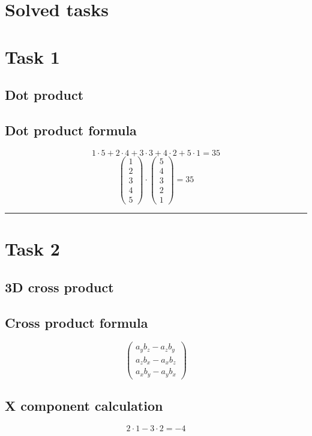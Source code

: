 \documentclass{article}
\begin{document}
\section*{Solved tasks}
\section*{Task 1}

\subsection*{Dot product}
\subsection*{ \vspace{1em} Dot product formula}
\[
1 \cdot 5 + 2 \cdot 4 + 3 \cdot 3 + 4 \cdot 2 + 5 \cdot 1 = 35
\]
\[
\begin{pmatrix}1 \\ 2 \\ 3 \\ 4 \\ 5\end{pmatrix} \cdot \begin{pmatrix}5 \\ 4 \\ 3 \\ 2 \\ 1\end{pmatrix} = 35
\]
\vspace{1em}
\hrule
\vspace{1em}
\section*{Task 2}

\subsection*{3D cross product}
\subsection*{ \vspace{1em} Cross product formula}
\[
\begin{pmatrix}
a_y b_z - a_z b_y \\ 
a_z b_x - a_x b_z \\ 
a_x b_y - a_y b_x
\end{pmatrix}
\]
\subsection*{ \vspace{1em} X component calculation}
\[
2 \cdot 1 - 3 \cdot 2 = -4
\]
\end{document}
